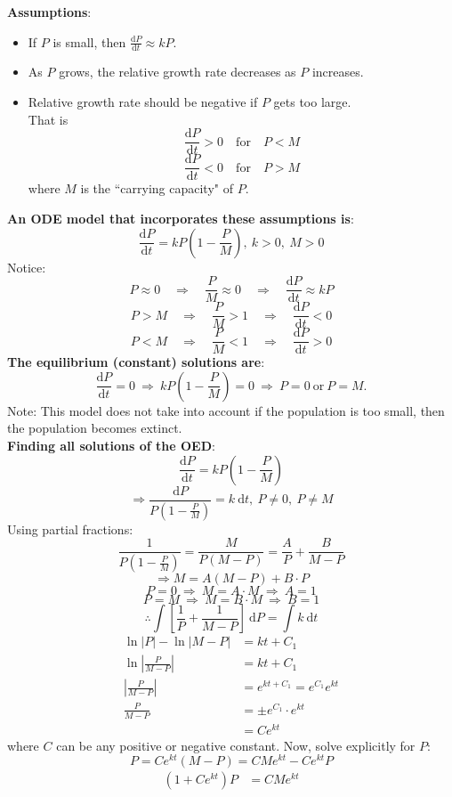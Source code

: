 \documentclass[12pt,a4paper]{article}
\def\d{{\mathrm{d}}}
\begin{document}
\begin{enumerate}
	\textbf{Assumptions}: 
	\begin{itemize}
		\item If $P$ is small, then $\displaystyle\frac{\d P}{\d t}\approx kP.$	
		\item As $P$ grows, the relative growth rate decreases as $P$ increases. 
		\item Relative growth rate should be negative if $P$ gets too large. \\
		That is 
		$$\frac{\d P}{\d t}>0\quad\text{for}\quad P<M$$
		$$\frac{\d P}{\d t}<0\quad\text{for}\quad P>M$$
		where $M$ is the ``carrying capacity" of $P$.
	\end{itemize}
	\textbf{An ODE model that incorporates these assumptions is}: 
	$$\frac{\d P}{\d t}=kP\left(1-\frac{P}{M}\right),\ k>0,\ M>0$$
	Notice: 
	$$P\approx0\quad\Rightarrow\quad\frac{P}{M}\approx0\quad\Rightarrow\quad\frac{\d P}{\d t}\approx kP$$
	$$P>M\quad\Rightarrow\quad\frac{P}{M}>1\quad\Rightarrow\quad\frac{\d P}{\d t}<0$$
	$$P<M\quad\Rightarrow\quad\frac{P}{M}<1\quad\Rightarrow\quad\frac{\d P}{\d t}>0$$
	\textbf{The equilibrium (constant) solutions are}: 
	$$\frac{\d P}{\d t}=0\ \Longrightarrow\ kP\left(1-\frac{P}{M}\right)=0\ \Rightarrow\ P=0\ \text{or}\ P=M.$$
	Note: This model does not take into account if the population is too small, then the population becomes extinct. \\
	\textbf{Finding all solutions of the OED}: 
	$$\frac{\d P}{\d t}=kP\left(1-\frac{P}{M}\right)$$
	$$\Rightarrow \frac{\d P}{P\left(1-\frac{P}{M}\right)}=k\ \d t,\ P\neq0,\ P\neq M$$
	Using partial fractions: 
	$$\frac{1}{P\left(1-\frac{P}{M}\right)}=\frac{M}{P(M-P)}=\frac{A}{P}+\frac{B}{M-P}$$
	$$\Rightarrow M=A(M-P)+B\cdot P$$
	$$P=0\ \Rightarrow\ M=A\cdot M\ \Rightarrow\ A=1$$
	$$P=M\ \Rightarrow\ M=B\cdot M\ \Rightarrow\ B=1$$
	$$\therefore \int \left[\frac{1}{P}+\frac{1}{M-P}\right]\ \d P=\int k\ \d t$$
	$$\begin{aligned}
		\ln|P|-\ln|M-P|&=kt+C_1\\
		\ln\left|\frac{P}{M-P}\right|&=kt+C_1\\
		\left|\frac{P}{M-P}\right|&=e^{kt+C_1}=e^{C_1}e^{kt}\\
		\frac{P}{M-P}&=\pm e^{C_1}\cdot e^{kt}\\
		&=Ce^{kt}
	\end{aligned}$$
	where $C$ can be any positive or negative constant. 
	Now, solve explicitly for $P$: 
	$$P=Ce^{kt}(M-P)=CMe^{kt}-Ce^{kt}P$$
	$$\begin{aligned}
		\left(1+Ce^{kt}\right)P&=CMe^{kt}\\

\end{aligned}$$
\end{enumerate}
\end{document}
